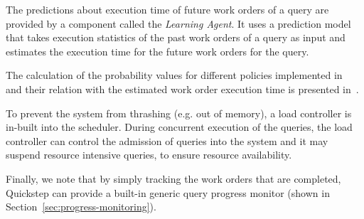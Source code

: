 The predictions about execution time of future work orders of a query are provided by a component called the \textit{Learning Agent}.
It uses a prediction model that takes execution statistics of the past work orders of a query as input and estimates the execution time for the future work orders for the query.

The calculation of the probability values for different policies implemented in \Quickstep\, and their relation with the estimated work order execution time is presented in~\cite{DBLP:conf/bigdata/DeshmukhMP17}.

To prevent the system from thrashing (e.g. out of memory), a load controller is in-built into the scheduler.
During concurrent execution of the queries, the load controller can control the admission of queries into the system and it may suspend resource intensive queries, to ensure resource availability.

Finally, we note that by simply tracking the work orders that are completed, Quickstep can provide a built-in generic query progress monitor (shown in Section~\ref{sec:progress-monitoring}).
